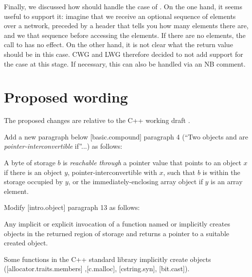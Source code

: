 Finally, we discussed how  should handle the case of . On the one hand, it seems useful to support it: imagine that we receive an optional sequence of elements over a network, preceded by a header that tells you how many elements there are, and we  that sequence before accessing the elements. If there are no elements, the call to \mbox{} has no effect. On the other hand, it is not clear what the return value should be in this case. CWG and LWG therefore decided to not add support for the  case at this stage. If necessary, this can also be handled via an NB comment.

\section{Proposed wording}
\label{sec:wording}

The proposed changes are relative to the C++ working draft \cite{N4910}. 

Add a new paragraph below [basic.compound] paragraph 4 (``Two objects  and  are \emph{pointer-interconvertible} if''...) as follows:

\begin{addedblock}
\begin{adjustwidth}{0.5cm}{0.5cm}
 A byte of storage $b$ is \emph{reachable through} a pointer value that points to an object $x$ if there is an object $y$, pointer-interconvertible with $x$, such that $b$ is within the storage occupied by $y$, or the immediately-enclosing array object if $y$ is an array element.
\end{adjustwidth}
\end{addedblock}

Modify [intro.object] paragraph 13 as follows:

\begin{adjustwidth}{0.5cm}{0.5cm}
Any implicit or explicit invocation of a function
named  or 
implicitly creates objects in the returned region of storage and
returns a pointer to a suitable created object.
\begin{note}
Some functions in the C++ standard library implicitly create objects ([allocator.traits.members] ,[c.malloc], [cstring.syn], [bit.cast]).
\end{note}

\end{adjustwidth}


